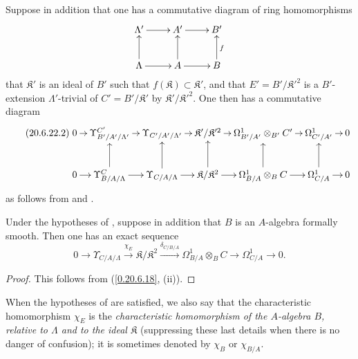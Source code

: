 Suppose in addition that one has a commutative diagram of ring homomorphisms
\[
\xymatrix{
  \Lambda' \ar[r] & A' \ar[r] & B' \\
  \Lambda \ar[u] \ar[r] & A \ar[u] \ar[r] & B \ar[u]_f
}
\]
that $\mathfrak{K}'$ is an ideal of $B'$ such that $f(\mathfrak{K})\subset\mathfrak{K}'$, and that $E'=B'/\mathfrak{K}'^2$ is a $B'$-extension $\Lambda'$-trivial of $C'=B'/\mathfrak{K}'$ by $\mathfrak{K}'/\mathfrak{K}'^2$.
One then has a commutative diagram
\begin{equation}
\tag{20.6.22.2}
\label{0.20.6.22.2}
\xymatrix@C=0.7em{
  0 \ar[r] & \Upsilon^{C'}_{B'/A'/\Lambda'} \ar[r] & \Upsilon_{C'/A'/\Lambda'} \ar[r] & \mathfrak{K}'/\mathfrak{K}'^2 \ar[r] & \Omega^1_{B'/A'}\otimes_{B'} C' \ar[r] & \Omega^1_{C'/A'} \ar[r] & 0 \\
  0 \ar[r] & \Upsilon^C_{B/A/\Lambda} \ar[r] \ar[u] & \Upsilon_{C/A/\Lambda} \ar[r] \ar[u] & \mathfrak{K}/\mathfrak{K}^2 \ar[r] \ar[u] & \Omega^1_{B/A}\otimes_B C \ar[r] \ar[u] & \Omega^1_{C/A} \ar[r] \ar[u] & 0
}
\end{equation}
as follows from  and .

\begin{corollary}[20.6.23]
\label{0.20.6.23}
Under the hypotheses of \textup{}, suppose in addition that $B$ is an $A$-algebra formally smooth.
Then one has an exact sequence
\begin{equation}
\tag{20.6.23.1}
  \label{0.20.6.23.1}
  0\to\Upsilon_{C/A/\Lambda}\xrightarrow{\chi_E}\mathfrak{K}/\mathfrak{K}^2\xrightarrow{\delta_{C/B/A}}\Omega^1_{B/A}\otimes_B C\to\Omega^1_{C/A}\to 0.
\end{equation}
\end{corollary}

\begin{proof}
This follows from (\ref{0.20.6.18}, (ii)).
\end{proof}

\begin{env}[20.6.24]
\label{0.20.6.24}
When the hypotheses of  are satisfied, we also say that the characteristic homomorphism $\chi_E$ is the \emph{characteristic homomorphism of the $A$-algebra $B$, relative to $\Lambda$ and to the ideal $\mathfrak{K}$} (suppressing these last details when there is no danger of confusion); it is sometimes denoted by $\chi_B$ or $\chi_{B/A}$.
\end{env}

